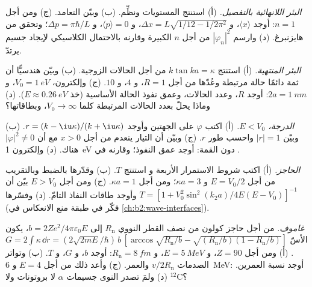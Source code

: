 \begin{exercise}[$\star\star$]\label{exo:b2:potential-wells-tunneling:5}
\emph{البئر اللانهائية بالتفصيل.} (أ) استنتج المستويات ونظِّم.
(ب) وبيّن التعامد. (ج) ومن أجل $n = 1$: أوجد $\langle x\rangle$، و $\Delta x =
L\sqrt{1/12 - 1/2\pi^2}$، و $\langle p\rangle = 0$، و $\Delta p = \pi\hbar/L$؛ وتحقق من
هايزنبرغ. (د) وارسم $|\varphi_n|^2$ من أجل $n$ الكبيرة وقارنه بالاحتمال
الكلاسيكي لإيجاد جسيم يرتدّ.
\end{exercise}

\begin{exercise}[$\star\star$]\label{exo:b2:potential-wells-tunneling:6}
\emph{البئر المنتهية.} (أ) استنتج $k\tan ka = \kappa$ من أجل الحالات الزوجية.
(ب) وبيّن هندسيًّا أن ثمة دائمًا حالة مرتبطة وعُدّها من أجل
$R = 1$، و $4$، و $10$. (ج) وإلكترون، $V_0 = \qty{1}{eV}$، و $2a = \qty{1}{nm}$:
أوجد $R$، وعدد الحالات، وعمق نفوذ الحالة الأساسية (خذ
$E \approx \qty{0.26}{eV}$). (د) وماذا يحلّ بعدد الحالات المرتبطة
كلما $V_0 \to \infty$، وبطاقاتها؟
\end{exercise}

\begin{exercise}[$\star\star$]\label{exo:b2:potential-wells-tunneling:7}
\emph{الدرجة، $E < V_0$.} (أ) اكتب $\varphi$ على الجهتين وأوجد $r =
(k - \iu\kappa)/(k + \iu\kappa)$. (ب) وبيّن $|r| = 1$ واحسب طور
$r$. (ج) وبيّن أن التيار ينعدم من أجل $x > 0$ مع أن $|\varphi|^2 \ne
0$ هناك. (د) وإلكترون \qty{1}{eV} دون القمة: أوجد عمق النفوذ؛
وقارنه  في .
\end{exercise}

\begin{exercise}[$\star\star$]\label{exo:b2:potential-wells-tunneling:8}
\emph{الحاجز.} (أ) اكتب شروط الاستمرار الأربعة و
استنتج $T$. (ب) وقدّرها بالضبط وبالتقريب من أجل $E =
V_0/2$ و $\kappa a = 3$؛ ومن أجل $\kappa a = 1$. (ج) ومن أجل $E > V_0$ بيّن أن $T = [1 +
V_0^2\sin^2(k_2a)/4E(E - V_0)]^{-1}$ وأوجد طاقات النفاذ
التامّ. (د) وفسّرها (فكّر في طبقة منع الانعكاس في
\cref{ch:b2:wave-interfaces}).
\end{exercise}

\begin{exercise}[$\star\star$]\label{exo:b2:potential-wells-tunneling:9}
\emph{غاموف.} من أجل حاجز كولون من نصف القطر النووي $R_{\text{n}}$
إلى $b = 2Ze^2/4\pi\varepsilon_0E$، يكون الأسّ $G = 2\int\kappa\,\dd r =
(2\sqrt{2mE}/\hbar)\,b\,[\arccos\sqrt{R_{\text{n}}/b} - \sqrt{(R_{\text{n}}/b)(1 -
R_{\text{n}}/b)}]$. (أ) ومن أجل $Z = 90$، و $E = \qty{5}{MeV}$، و $R_{\text{n}} = \qty{8}{fm}$:
أوجد $b$، و $G$، و $T$. (ب) وتواتر الصدمات $v/2R_{\text{n}}$ والعمر. (ج)
وأعد ذلك من أجل $E = 4$ و \qty{6}{MeV}: أوجد نسبة العمرين. (د) ولمَ
تصدر النوى جسيمات $\alpha$ لا بروتونات ولا $^{12}$C؟
\end{exercise}

